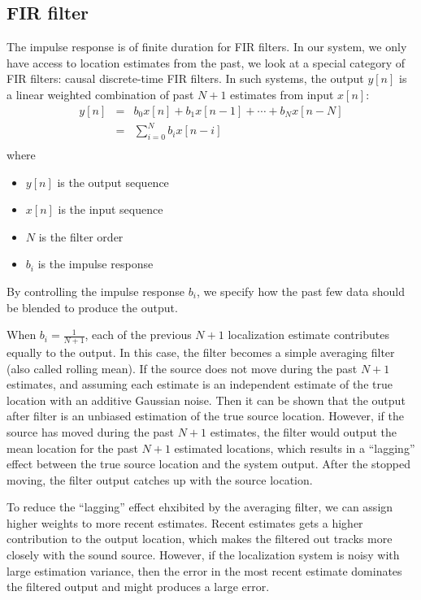 \subsection{FIR filter}
The impulse response is of finite duration for FIR filters. In our system, we only have access to location estimates from the past, we look at a special category of FIR filters: causal discrete-time FIR filters. In such systems, the output $y[n]$ is a linear weighted combination of past $N+1$ estimates from input $x[n]$:
\begin{eqnarray}
y[n] & = & b_0x[n] + b_1x[n-1] + \cdots + b_Nx[n-N]\\
& = & \sum_{i=0}^N b_i x[n-i]\\
\end{eqnarray}
where
\begin{itemize}
\item $y[n]$ is the output sequence
\item $x[n]$ is the input sequence
\item $N$ is the filter order
\item $b_i$ is the impulse response
\end{itemize}

By controlling the impulse response $b_i$, we specify how the past few data should be blended to produce the output. 

When $b_i=\frac{1}{N+1}$, each of the previous $N+1$ localization estimate contributes equally to the output. In this case, the filter becomes a simple averaging filter (also called rolling mean). If the source does not move during the past $N+1$ estimates, and assuming each estimate is an independent estimate of the true location with an additive Gaussian noise. Then it can be shown that the output after filter is an unbiased estimation of the true source location. However, if the source has moved during the past $N+1$ estimates, the filter would output the mean location for the past $N+1$ estimated locations, which results in a ``lagging'' effect between the true source location and the system output. After the stopped moving, the filter output catches up with the source location. 

To reduce the ``lagging'' effect ehxibited by the averaging filter, we can assign higher weights to more recent estimates. Recent estimates gets a higher contribution to the output location, which makes the filtered out tracks more closely with the sound source. However, if the localization system is noisy with large estimation variance, then the error in the most recent estimate dominates the filtered output and might produces a large error.

